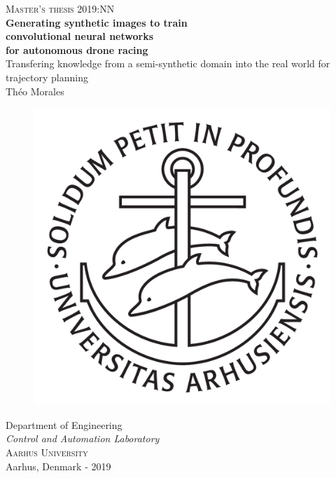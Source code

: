 \newpage
\thispagestyle{empty}
\begin{center}
	\textsc{\large Master's thesis 2019:NN}\\[4cm]		%
	\textbf{\Large Generating synthetic images to train\\convolutional neural
	networks\\[0.2cm]for autonomous drone racing} \\[1cm]
	{\large Transfering knowledge from a semi-synthetic domain into the real
	world for trajectory planning}\\[1cm]
	{\large Théo Morales}
	
	\vfill	
	\begin{figure}[H]
	\centering
	\includegraphics[width=0.2\pdfpagewidth]{figure/auxiliary/ausegl_sort.pdf} \\	
	\end{figure}	\vspace{5mm}	
	
	Department of Engineering\\
	\emph{Control and Automation Laboratory}\\
	\textsc{Aarhus University} \\
	Aarhus, Denmark - 2019\\
\end{center}


